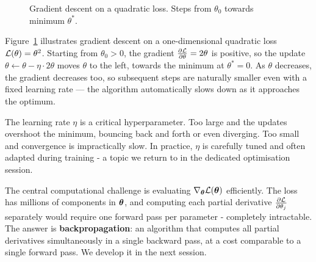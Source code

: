 \begin{figure}
\centering
{}
\resizebox{0.40\textwidth}{!}{}
\caption{Gradient descent on a quadratic loss. Steps from $\theta_0$ towards minimum $\theta^*$.}
\label{fig:gradient_descent}
\end{figure}

Figure~\ref{fig:gradient_descent} illustrates gradient descent on a one-dimensional quadratic loss $\mathcal{L}(\theta) = \theta^2$. Starting from $\theta_0 > 0$, the gradient $\frac{\partial \mathcal{L}}{\partial \theta} = 2\theta$ is positive, so the update $\theta \leftarrow \theta - \eta \cdot 2\theta$ moves $\theta$ to the left, towards the minimum at $\theta^* = 0$. As $\theta$ decreases, the gradient decreases too, so subsequent steps are naturally smaller even with a fixed learning rate — the algorithm automatically slows down as it approaches the optimum.

The learning rate $\eta$ is a critical hyperparameter. Too large and the updates overshoot the minimum, bouncing back and forth or even diverging. Too small and convergence is impractically slow. In practice, $\eta$ is carefully tuned and often adapted during training - a topic we return to in the dedicated optimisation session.

The central computational challenge is evaluating $\nabla_{\boldsymbol{\theta}} \mathcal{L}(\boldsymbol{\theta})$ efficiently. The loss has millions of components in $\boldsymbol{\theta}$, and computing each partial derivative $\frac{\partial \mathcal{L}}{\partial \theta_j}$ separately would require one forward pass per parameter - completely intractable. The answer is \textbf{backpropagation}: an algorithm that computes all partial derivatives simultaneously in a single backward pass, at a cost comparable to a single forward pass. We develop it in the next session.
